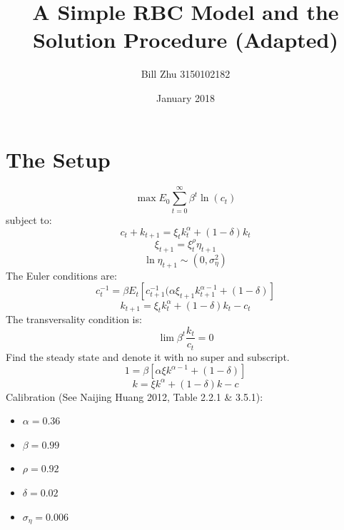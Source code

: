 \documentclass{article}
\title{A Simple RBC Model and the Solution Procedure (Adapted)}
\author{Bill Zhu 3150102182}
\date{January 2018}
\begin{document}
\maketitle

\vspace{40pt}
\tableofcontents
\newpage

\section{The Setup}
$$\max E_0\sum_{t=0}^\infty \beta^t \ln(c_t)$$
subject to: 
$$c_t+k_{t+1} = \xi_tk_t^\alpha+(1-\delta)k_t$$
$$\xi_{t+1}=\xi_t^\rho\eta_{t+1}$$
$$\ln\eta_{t+1}\sim(0,\sigma_\eta^2)$$
The Euler conditions are:
$$c_t^{-1}=\beta E_t[c_{t+1}^{-1}(\alpha\xi_{t+1}k_{t+1}^{\alpha-1}+(1-\delta)]$$
$$k_{t+1}=\xi_t k_t^\alpha+(1-\delta)k_t-c_t$$
The transversality condition is:
$$\lim \beta^t\frac{k_t}{c_t} = 0$$
Find the steady state and denote it with no super and subscript.
$$1=\beta [\alpha \xi k^{\alpha-1}+(1-\delta)]$$
$$k=\xi k^\alpha + (1-\delta)k-c$$
Calibration (See Naijing Huang 2012, Table 2.2.1 \& 3.5.1): 
\begin{itemize}
    \item $\alpha=0.36$
    \item $\beta=0.99$
    \item $\rho=0.92$
    \item $\delta=0.02$
    \item $\sigma_\eta=0.006$
\end{itemize}

\newpage
\end{document}
